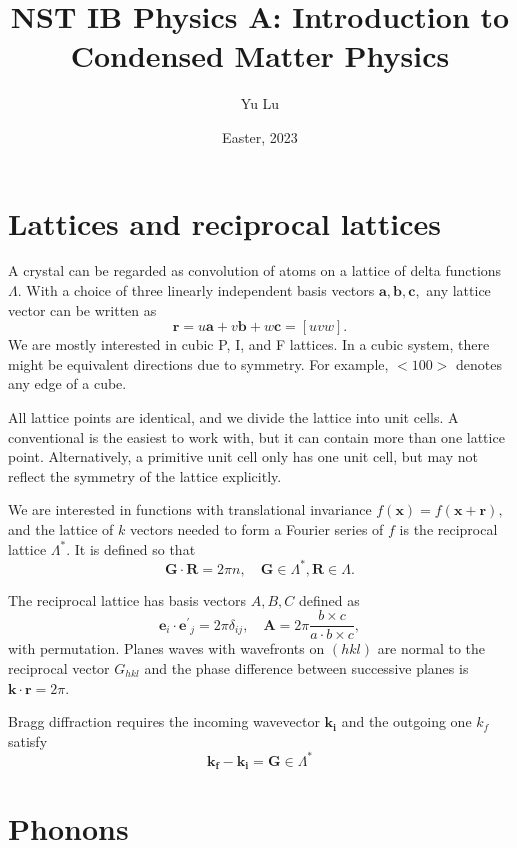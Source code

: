 \documentclass{article}
\title{NST IB Physics A: Introduction to Condensed Matter Physics}
\date{Easter, 2023}
\author{Yu Lu}
\theoremstyle{nonumberplain}
\begin{document}
\maketitle 
\tableofcontents
\section{Lattices and reciprocal lattices}
A crystal can be regarded as convolution of atoms on a lattice of delta functions $\Lambda.$ With a choice of three linearly independent basis vectors $\mathbf{a}, \mathbf{b}, \mathbf{c},$ any lattice vector can be written as
\[
    \mathbf{r} = u \mathbf{a}  + v \mathbf{b} + w \mathbf{c} = [uvw]. 
\]
We are mostly interested in cubic P, I, and F lattices. In a cubic system, there might be equivalent directions due to symmetry. For example, $<100>$ denotes any edge of a cube. 

All lattice points are identical, and we divide the lattice into unit cells. A conventional is the easiest to work with, but it can contain more than one lattice point. Alternatively, a primitive unit cell only has one unit cell, but may not reflect the symmetry of the lattice explicitly. 

We are interested in functions with translational invariance $f(\mathbf{x} ) = f(\mathbf{x} + \mathbf{r}),$ and the lattice of $k$ vectors needed to form a Fourier series of $f$ is the reciprocal lattice $\Lambda^{*}.$ It is defined so that 
\[
    \mathbf{G}  \cdot \mathbf{R}  = 2\pi n, \quad \mathbf{G} \in \Lambda^{*}, \mathbf{R} \in \Lambda.
\]

The reciprocal lattice has basis vectors $A, B, C$ defined as 
\[
    \boxed{\mathbf{e}_i \cdot \mathbf{e^\prime }_j   = 2\pi \delta_{ij}, \quad \mathbf{A} = 2\pi \frac{b\times c}{a\cdot b \times c}, }
\]
with permutation. Planes waves with wavefronts on $(hkl)$ are normal to the reciprocal vector $G_{hkl}$ and the phase difference between successive planes is $\mathbf{k} \cdot \mathbf{r}  = 2\pi.$ 

Bragg diffraction requires the incoming wavevector $\mathbf{k_i}$ and the outgoing one $k_f$ satisfy
\[
    \boxed{\mathbf{k_f} - \mathbf{k_i}  = \mathbf{G} \in \Lambda^{*}}
\]
\section{Phonons}
\end{document}
